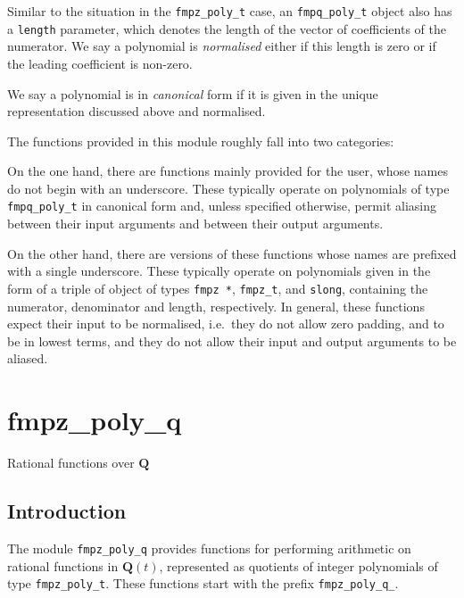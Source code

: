 \documentclass[a4paper,10pt]{book}
\newcommand{\Q}{\mathbf{Q}}%
\newcommand{\code}{\lstinline}
\begin{document}
{{Similar to the situation in the \code{fmpz_poly_t} case, an
\code{fmpq_poly_t} object also has a \code{length} parameter, which
denotes the length of the vector of coefficients of the numerator.
We say a polynomial is \emph{normalised} either if this length is zero
or if the leading coefficient is non-zero.

We say a polynomial is in \emph{canonical} form if it is given in the
unique representation discussed above and normalised.

The functions provided in this module roughly fall into two categories:

On the one hand, there are functions mainly provided for the user, whose
names do not begin with an underscore.  These typically operate on
polynomials of type \code{fmpq_poly_t} in canonical form and, unless
specified otherwise, permit aliasing between their input arguments and
between their output arguments.

On the other hand, there are versions of these functions whose names are
prefixed with a single underscore.  These typically operate on polynomials
given in the form of a triple of object of types \code{fmpz *},
\code{fmpz_t}, and \code{slong}, containing the numerator, denominator and
length, respectively.  In general, these functions expect their input to
be normalised, i.e.\ they do not allow zero padding, and to be in lowest
terms, and they do not allow their input and output arguments to be aliased.




\chapter{fmpz\_poly\_q}
\epigraph{Rational functions over $\Q$}{}

\section{Introduction}

The module \code{fmpz_poly_q} provides functions for performing
arithmetic on rational functions in $\mathbf{Q}(t)$, represented as
quotients of integer polynomials of type \code{fmpz_poly_t}.  These
functions start with the prefix \code{fmpz_poly_q_}.

}}
\end{document}
